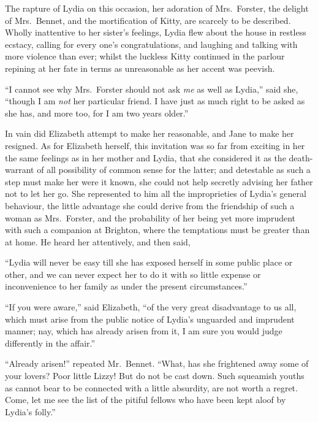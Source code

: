 The rapture of Lydia on this occasion, her adoration of
Mrs.\ Forster, the delight of Mrs.\ Bennet, and the mortification
of Kitty, are scarcely to be described. Wholly inattentive
to her sister’s feelings, Lydia flew about the house in
restless ecstacy, calling for every one’s congratulations, and
laughing and talking with more violence than ever; whilst
the luckless Kitty continued in the parlour repining at her
fate in terms as unreasonable as her accent was peevish.

“I cannot see why Mrs.\ Forster should not ask \textit{me} as
well as Lydia,” said she, “though I am \textit{not} her particular
friend. I have just as much right to be asked as she has,
and more too, for I am two years older.”

In vain did Elizabeth attempt to make her reasonable,
and Jane to make her resigned. As for Elizabeth herself,
this invitation was so far from exciting in her the same
feelings as in her mother and Lydia, that she considered
it as the death-warrant of all possibility of common sense
for the latter; and detestable as such a step must make
her were it known, she could not help secretly advising
her father not to let her go. She represented to him all
the improprieties of Lydia’s general behaviour, the little
advantage she could derive from the friendship of such
a woman as Mrs.\ Forster, and the probability of her being
yet more imprudent with such a companion at Brighton,
where the temptations must be greater than at home.
He heard her attentively, and then said,

“Lydia will never be easy till she has exposed herself
in some public place or other, and we can never expect her
to do it with so little expense or inconvenience to her
family as under the present circumstances.”

“If you were aware,” said Elizabeth, “of the very great
disadvantage to us all, which must arise from the public
notice of Lydia’s unguarded and imprudent manner; nay,
which has already arisen from it, I am sure you would
judge differently in the affair.”

“Already arisen!” repeated Mr.\ Bennet. “What, has
she frightened away some of your lovers? Poor little
Lizzy! But do not be cast down. Such squeamish youths
as cannot bear to be connected with a little absurdity,
are not worth a regret. Come, let me see the list of the
pitiful fellows who have been kept aloof by Lydia’s folly.”

